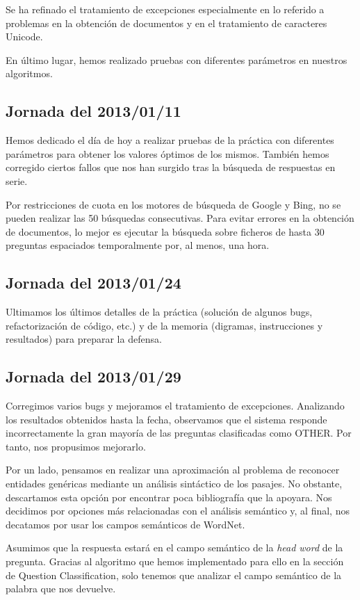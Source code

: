 \documentclass[12pt,a4paper,titlepage]{article}
\begin{document}
Se ha refinado el tratamiento de excepciones especialmente en lo referido a problemas en la obtención de documentos y en el tratamiento de caracteres Unicode.

En último lugar, hemos realizado pruebas con diferentes parámetros en nuestros algoritmos.

\subsection{Jornada del 2013/01/11}
Hemos dedicado el día de hoy a realizar pruebas de la práctica con diferentes parámetros para obtener los valores óptimos de los mismos. También hemos corregido ciertos fallos que nos han surgido tras la búsqueda de respuestas en serie.

Por restricciones de cuota en los motores de búsqueda de Google y Bing, no se pueden realizar las 50 búsquedas consecutivas. Para evitar errores en la obtención de documentos, lo mejor es ejecutar la búsqueda sobre ficheros de hasta 30 preguntas espaciados temporalmente por, al menos, una hora.

\subsection{Jornada del 2013/01/24}
Ultimamos los últimos detalles de la práctica (solución de algunos bugs, refactorización de código, etc.) y de la memoria (digramas, instrucciones y resultados) para preparar la defensa.

\subsection{Jornada del 2013/01/29}
Corregimos varios bugs y mejoramos el tratamiento de excepciones. Analizando los resultados obtenidos hasta la fecha, observamos que el sistema responde incorrectamente la gran mayoría de las preguntas clasificadas como OTHER. Por tanto, nos propusimos mejorarlo.

Por un lado, pensamos en realizar una aproximación al problema de reconocer entidades genéricas mediante un análisis sintáctico de los pasajes. No obstante, descartamos esta opción por encontrar poca bibliografía que la apoyara. Nos decidimos por opciones más relacionadas con el análisis semántico y, al final, nos decatamos por usar los campos semánticos de WordNet.

Asumimos que la respuesta estará en el campo semántico de la \emph{head word} de la pregunta. Gracias al algoritmo que hemos implementado para ello en la sección de Question Classification, solo tenemos que analizar el campo semántico de la palabra que nos devuelve.
\end{document}
